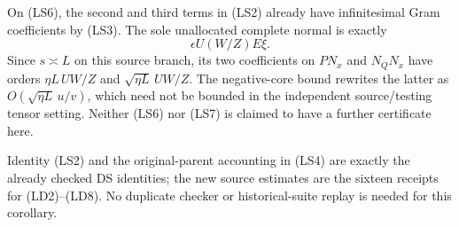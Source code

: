 On (LS6), the second and third terms in (LS2) already have
infinitesimal Gram coefficients by (LS3). The sole unallocated
complete normal is exactly
\[
                         \epsilon U(W/Z)E\xi.          \tag{LS7}
\]
Since $s\asymp L$ on this source branch, its two coefficients on
$PN_x$ and $N_QN_x$ have orders
$\eta L\,UW/Z$ and $\sqrt{\eta L}\,UW/Z$.
The negative-core bound rewrites the latter as
$O(\sqrt{\eta L}\,u/v)$, which need not be bounded in the
independent source/testing tensor setting. Neither (LS6) nor
(LS7) is claimed to have a further certificate here.

Identity (LS2) and the original-parent accounting in (LS4) are exactly
the already checked DS identities; the new source estimates are
the sixteen receipts for (LD2)--(LD8). No duplicate checker or
historical-suite replay is needed for this corollary.
